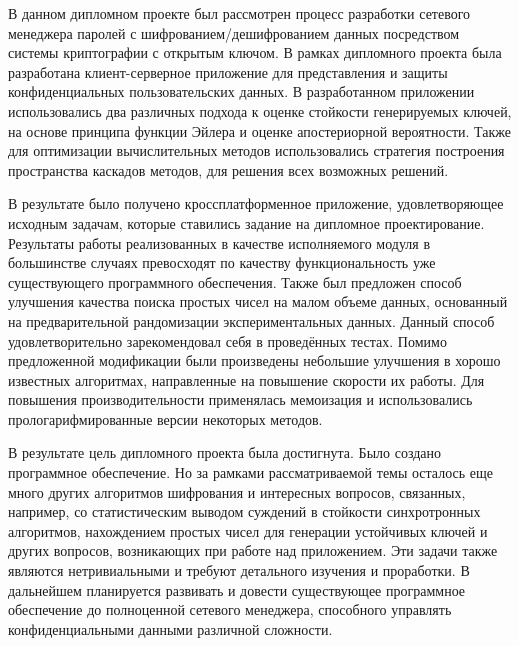 
В данном дипломном проекте был рассмотрен процесс разработки сетевого менеджера паролей с шифрованием/дешифрованием данных посредством системы криптографии с открытым ключом.
В рамках дипломного проекта была разработана клиент-серверное приложение для представления и защиты конфиденциальных пользовательских данных.
В разработанном приложении использовались два различных подхода к оценке стойкости генерируемых ключей, на основе принципа функции Эйлера и оценке апостериорной вероятности.
Также для оптимизации вычислительных методов использовались стратегия построения пространства каскадов методов, для решения всех возможных решений.

В результате было получено кроссплатформенное приложение, удовлетворяющее исходным задачам, которые ставились задание на дипломное проектирование.
Результаты работы реализованных в качестве исполняемого модуля в большинстве случаях превосходят по качеству функциональность уже существующего программного обеспечения.
Также был предложен способ улучшения качества поиска простых чисел на малом объеме данных, основанный на предварительной рандомизации экспериментальных данных.
Данный способ удовлетворительно зарекомендовал себя в проведённых тестах.
Помимо предложенной модификации были произведены небольшие улучшения в хорошо известных алгоритмах, направленные на повышение скорости их работы.
Для повышения производительности применялась мемоизация и использовались прологарифмированные версии некоторых методов.

В результате цель дипломного проекта была достигнута.
Было создано программное обеспечение.
Но за рамками рассматриваемой темы осталось еще много других алгоритмов шифрования и интересных вопросов, связанных, например, со статистическим выводом суждений в стойкости синхротронных алгоритмов, нахождением простых чисел для генерации устойчивых ключей и других вопросов, возникающих при работе над приложением.
Эти задачи также являются нетривиальными и требуют детального изучения и проработки.
В дальнейшем планируется развивать и довести существующее программное обеспечение до полноценной сетевого менеджера, способного управлять конфиденциальными данными различной сложности.